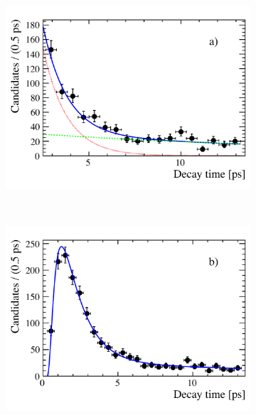 \begin{figure}[tbp]
    \centering
   \begin{subfigure}[b]{0.48\textwidth}
        \includegraphics[width= \textwidth]{./Figs/LifetimeMeasurement/CBG_slope_fit.pdf}
    \end{subfigure}
   ~ %
    \begin{subfigure}[b]{0.48\textwidth}
       \includegraphics[width=\textwidth]{./Figs/LifetimeMeasurement/CBG_accpt_fit.pdf}

\end{subfigure}
\end{figure}
